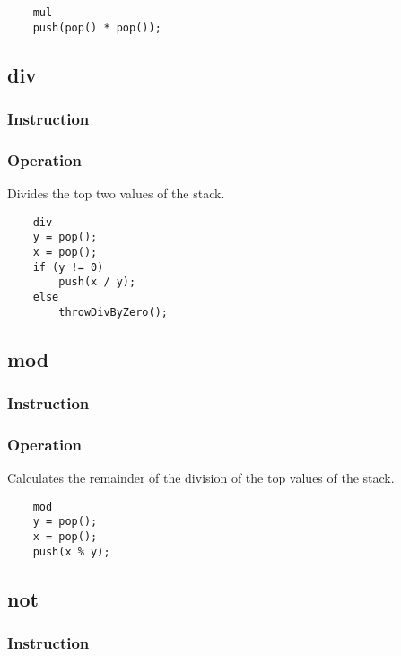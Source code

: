 	\begin{lstlisting}
	mul
	push(pop() * pop());
	\end{lstlisting}

\subsection{div}
\subsubsection{Instruction}

\subsubsection{Operation}
Divides the top two values of the stack.

	\begin{lstlisting}
	div
	y = pop();
	x = pop();
	if (y != 0)
		push(x / y);
	else
		throwDivByZero();
	\end{lstlisting}

\subsection{mod}
\subsubsection{Instruction}

\subsubsection{Operation}
Calculates the remainder of the division of the top values of the stack.

	\begin{lstlisting}
	mod
	y = pop();
	x = pop();
	push(x % y);
	\end{lstlisting}

\subsection{not}
\subsubsection{Instruction}

